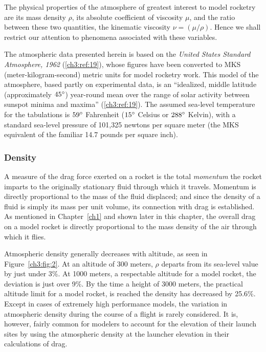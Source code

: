 The physical properties of the atmosphere of greatest interest to model
rocketry are its mass density $\rho$, its absolute coefficient of viscosity
$\mu$, and the ratio between these two quantities, the kinematic viscosity
$\nu = (\mu/\rho)$. Hence we shall restrict our attention to phenomena
associated with these variables.

The atmospheric data presented herein is based on the \emph{United States
Standard Atmosphere, 1962} (\ref{ch3:ref:19}), whose figures have been
converted to MKS (meter-kilogram-second) metric units for model rocketry work.
This model of the atmosphere, based partly on experimental data, is an
``idealized, middle latitude (approximately $45^{\circ}$) year-round mean over the
range of solar activity between sunspot minima and maxima''
(\ref{ch3:ref:19}). The assumed sea-level temperature for the tabulations is
$59^{\circ}$ Fahrenheit ($15^{\circ}$ Celsius or $288^{\circ}$ Kelvin), with a standard
sea-level pressure of 101,325 newtons per square meter (the MKS equivalent of
the familiar 14.7 pounds per square inch).

\subsubsection{Density}\label{ch3:sec:2.1.1}

A measure of the drag force exerted on a rocket is the total \emph{momentum}
the rocket imparts to the originally stationary fluid through which it
travels. Momentum is directly proportional to the mass of the fluid displaced;
and since the density of a fluid is simply its mass per unit volume, its
connection with drag is established. As mentioned in Chapter~\ref{ch1} and
shown later in this chapter, the overall drag on a model rocket is directly
proportional to the mass density of the air through which it flies.

Atmospheric density generally decreases with altitude, as seen in
Figure~\ref{ch3:fig:2}. At an altitude of 300 meters, $\rho$ departs from its
sea-level value by just under 3\%. At 1000 meters, a respectable altitude for
a model rocket, the deviation is just over 9\%. By the time a height of 3000
meters, the practical altitude limit for a model rocket, is reached the
density has decreased by 25.6\%. Except in cases of extremely high performance
models, the variation in atmospheric density during the course of a flight is
rarely considered. It is, however, fairly common for modelers to account for
the elevation of their launch sites by using the atmospheric density at the
launcher elevation in their calculations of drag.

